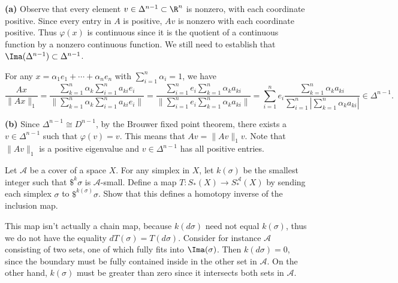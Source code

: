 \documentclass[11pt,letterpaper]{article}
\begin{document}
\begin{solution}
    \textbf{(a)} Observe that every element $v\in \Delta^{n-1}\subset \R^n$ is nonzero, with each coordinate positive. Since every entry in $A$ is positive, $Av$ is nonzero with each coordinate positive. Thus $\varphi(x)$ is continuous since it is the quotient of a continuous function by a nonzero continuous function. We still need to establish that $\Ima(\Delta^{n-1})\subset \Delta^{n-1}$.

    For any $x=\alpha_1e_1+\cdots+\alpha_ne_n$ with $\sum^n_{i=1}\alpha_i=1$, we have
    \[
        \frac{Ax}{\|Ax\|_1} = \frac{\sum^n_{k=1}\alpha_k \sum^n_{i=1} a_{ki}e_i}{\|\sum^n_{k=1}\alpha_k \sum^n_{i=1} a_{ki}e_i\|}=\frac{\sum^n_{i=1}e_i \sum^n_{k=1} \alpha_ka_{ki}}{\|\sum^n_{i=1}e_i \sum^n_{k=1} \alpha_ka_{ki}\|}=\sum^n_{i=1}e_i\frac{\sum^n_{k=1}\alpha_ka_{ki}}{\sum^n_{i=1}\left|\sum^n_{k=1} \alpha_ka_{ki}\right|}\in \Delta^{n-1}
    .\] 
    
    \textbf{(b)} Since $\Delta^{n-1}\cong D^{n-1}$, by the Brouwer fixed point theorem, there exists a $v\in \Delta^{n-1}$ such that $\varphi(v)=v$. This means that $Av=\|Av\|_1 v$. Note that $\|Av\|_1$ is a positive eigenvalue and $v\in \Delta^{n-1}$ has all positive entries.
\end{solution}

\begin{problem}
    Let $\mathcal{A}$ be a cover of a space $X$. For any simplex in $X$, let $k(\sigma)$ be the smallest integer such that $\$^k\sigma$ is $\mathcal{A}$-small. Define a map $T : S_*(X)\to S^\mathcal{A}_*(X)$ by sending each simplex $\sigma$ to $\$^{k(\sigma)}\sigma$. Show that this defines a homotopy inverse of the inclusion map.   
\end{problem}

\begin{solution}
    This map isn't actually a chain map, because $k(d\sigma)$ need not equal $k(\sigma)$, thus we do not have the equality $dT(\sigma)=T(d\sigma)$. Consider for instance $\mathcal{A}$ consisting of two sets, one of which fully fits into $\Ima(\sigma)$. Then $k(d\sigma)=0$, since the boundary must be fully contained inside in the other set in $\mathcal{A}$. On the other hand, $k(\sigma)$ must be greater than zero since it intersects both sets in $\mathcal{A}$.
\end{solution}
\end{document}
